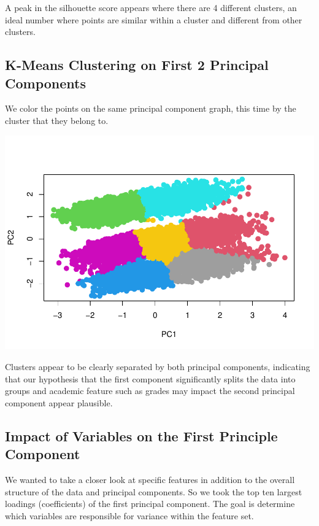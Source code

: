\documentclass[
]{article}
\begin{document}
A peak in the silhouette score appears where there are 4 different
clusters, an ideal number where points are similar within a cluster and
different from other clusters.

\subsection{K-Means Clustering on First 2 Principal
Components}\label{k-means-clustering-on-first-2-principal-components}

We color the points on the same principal component graph, this time by
the cluster that they belong to.

\includegraphics{ST494_FP_files/figure-latex/unnamed-chunk-12-1.pdf}

Clusters appear to be clearly separated by both principal components,
indicating that our hypothesis that the first component significantly
splits the data into groups and academic feature such as grades may
impact the second principal component appear plausible.

\subsection{Impact of Variables on the First Principle
Component}\label{impact-of-variables-on-the-first-principle-component}

We wanted to take a closer look at specific features in addition to the
overall structure of the data and principal components. So we took the
top ten largest loadings (coefficients) of the first principal
component. The goal is determine which variables are responsible for
variance within the feature set.
\end{document}
